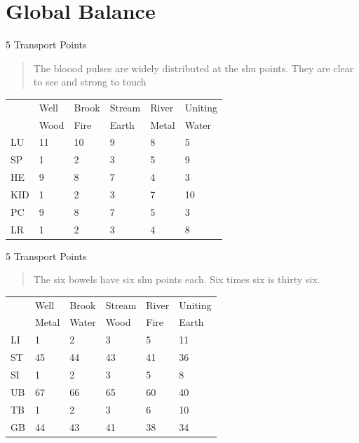 \section{Global Balance}

\begin{frame}{5 Transport Points}

\begin{quote}
The bloood pulses are widely distributed at the shu points. They are clear to see and strong to touch
\end{quote}

\begin{table}[]
\begin{tabular}{@{}llllll@{}}
    & Well & Brook & Stream & River & Uniting \\
    & Wood & Fire  & Earth  & Metal & Water   \\
LU  & 11   & 10    & 9      & 8     & 5       \\
SP  & 1    & 2     & 3      & 5     & 9       \\
HE  & 9    & 8     & 7      & 4     & 3       \\
KID & 1    & 2     & 3      & 7     & 10      \\
PC  & 9    & 8     & 7      & 5     & 3       \\
LR  & 1    & 2     & 3      & 4     & 8      
\end{tabular}
\end{table}

\end{frame}

\begin{frame}{5 Transport Points}

\begin{quote}
The six bowels have six shu points each. Six times six is thirty six. 
\end{quote}

\begin{table}[]
\begin{tabular}{@{}llllll@{}}
   & Well  & Brook & Stream & River & Uniting \\
   & Metal & Water & Wood   & Fire  & Earth   \\
LI & 1     & 2     & 3      & 5     & 11      \\
ST & 45    & 44    & 43     & 41    & 36      \\
SI & 1     & 2     & 3      & 5     & 8       \\
UB & 67    & 66    & 65     & 60    & 40      \\
TB & 1     & 2     & 3      & 6     & 10      \\
GB & 44    & 43    & 41     & 38    & 34     
\end{tabular}
\end{table}

\end{frame}

